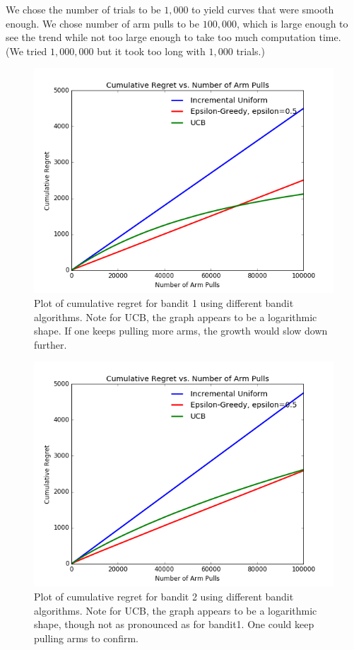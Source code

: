 \documentclass[paper=a4, fontsize=11pt]{scrartcl}
\begin{document}
We chose the number of trials to be $1,000$ to yield curves that were smooth enough. We chose number of arm pulls to be $100,000$, which is large enough to see the trend while not too large enough to take too much computation time. (We tried $1,000,000$ but it took too long with $1,000$ trials.)

\begin{figure}
\centering
	\includegraphics[width=1\linewidth]{bandit1_cumulative_regret.png}
\caption{Plot of cumulative regret for bandit 1 using different bandit algorithms. Note for UCB, the graph appears to be a logarithmic shape. If one keeps pulling more arms, the growth would slow down further.}
\label{fig:cumulative_bandit1}
\end{figure}

\begin{figure}
\centering
	\includegraphics[width=1\linewidth]{bandit2_cumulative_regret.png}
\caption{Plot of cumulative regret for bandit 2 using different bandit algorithms. Note for UCB, the graph appears to be a logarithmic shape, though not as pronounced as for bandit1. One could keep pulling arms to confirm.}
\label{fig:cumulative_bandit2}
\end{figure}
\end{document}
